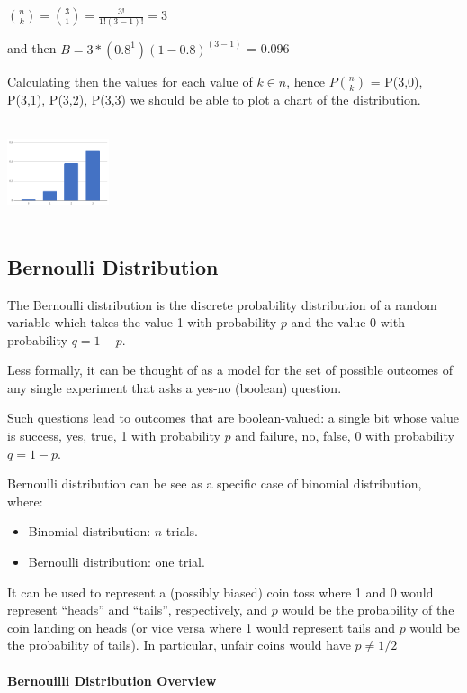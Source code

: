 \documentclass{article}
\begin{document}
$ \displaystyle {\binom {n}{k}} = {\binom {3}{1}} = \frac{3!}{1!(3 - 1)!} = 3$

and then $B = 3 * (0.8^1)(1 - 0.8)^(3-1)$ = 0.096

Calculating then the values for each value of $k \in n$, hence $P\binom {n}{k}$ = P(3,0), P(3,1), P(3,2), P(3,3) we should be able to plot a chart of the distribution.


\includegraphics[width=3cm, height=3cm]{excel_chart_1}

\subsection{Bernoulli Distribution}
The Bernoulli distribution is the discrete probability distribution of a random variable which takes the value 1 with probability $p$ and the value 0 with probability $q = 1 - p$. 

Less formally, it can be thought of as a model for the set of possible outcomes of any single experiment that asks a yes-no (boolean) question. 

Such questions lead to outcomes that are boolean-valued: a single bit whose value is success, yes, true, 1 with probability $p$ and failure, no, false, 0 with probability $q = 1 - p$. 

Bernoulli distribution can be see as a specific case of binomial distribution, where:
\begin{itemize}
    \item Binomial distribution: $n$ trials.
    \item Bernoulli distribution: one trial.
\end{itemize}

It can be used to represent a (possibly biased) coin toss where 1 and 0 would represent “heads” and “tails”, respectively, and $p$ would be the probability of the coin landing on heads (or vice versa where 1 would represent tails and $p$ would be the probability of tails). In particular, unfair coins would have $p \neq  1/2 $

\paragraph{Bernouilli Distribution Overview}\mbox{} \\
\end{document}
